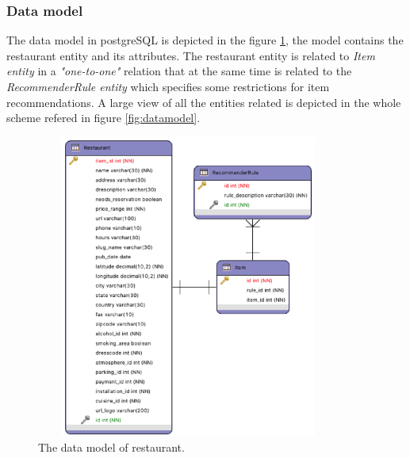 \subsubsection{Data model} \label{datamodelsection}   
The data model in postgreSQL is depicted in the figure
\ref{fig:restaurantmodeldata}, the model contains the restaurant
entity and its attributes. The restaurant entity is related to
\textit{Item entity} in a \textit{"one-to-one"} relation that at the
same time is related to the \textit{RecommenderRule entity} which
specifies some restrictions for item recommendations. A large view of
all the entities related is depicted in the whole scheme refered in
figure \ref{fig:datamodel}.
\begin{figure}
\captionsetup{justification=centering,margin=2cm}
\centering
\includegraphics[width=10cm,height=10cm,keepaspectratio]{img/data-resmodel.png}
\caption{The data model of restaurant.}
\label{fig:restaurantmodeldata}     
\end{figure}

